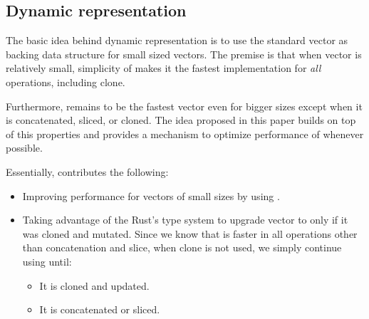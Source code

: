 \subsection{Dynamic representation}


The basic idea behind dynamic representation is to use the standard vector as backing data structure for small sized vectors. The premise is that when vector is relatively small, simplicity of \stdvec{} makes it the fastest implementation for \emph{all} operations, including clone. 

Furthermore, \stdvec{} remains to be the fastest vector even for bigger sizes except when it is concatenated, sliced, or cloned. The idea proposed in this paper builds on top of this properties and provides a mechanism to optimize performance of \pvec{} whenever possible.

Essentially, \pvec{} contributes the following:
\begin{itemize}
    \item Improving performance for vectors of small sizes by using \stdvec{}.     
    \item Taking advantage of the Rust's type system to upgrade vector to \rrbvec{} only if it was cloned and mutated. Since we know that \stdvec{} is faster in all operations other than concatenation and slice, when clone is not used, we simply continue using \stdvec{} until: 
    \begin{itemize}
        \item It is cloned and updated. 
        \item It is concatenated or sliced. 
    \end{itemize}
\end{itemize}


